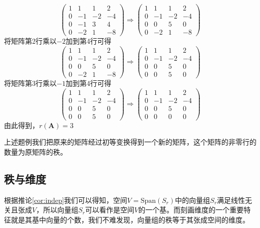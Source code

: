 \begin{example}
$$\begin{pmatrix}
		1 & 1 & 1 & 2\\
		0 & -1 & -2 & -4\\
		0 & -1 & 3 & 4\\
		0 & -2 & 1 & -8
	   \end{pmatrix}\Longrightarrow\begin{pmatrix}
		1 & 1 & 1 & 2\\
		0 & -1 & -2 & -4\\
		0 & 0 & 5 & 0\\
		0 & -2 & 1 & -8
	   \end{pmatrix}$$将矩阵第2行乘以$-2$加到第4行可得$$\begin{pmatrix}
		1 & 1 & 1 & 2\\
		0 & -1 & -2 & -4\\
		0 & 0 & 5 & 0\\
		0 & -2 & 1 & -8
	   \end{pmatrix}\Longrightarrow\begin{pmatrix}
		1 & 1 & 1 & 2\\
		0 & -1 & -2 & -4\\
		0 & 0 & 5 & 0\\
		0 & 0 & 5 & 0
	   \end{pmatrix}$$将矩阵第3行乘以$-1$加到第4行可得$$\begin{pmatrix}
		1 & 1 & 1 & 2\\
		0 & -1 & -2 & -4\\
		0 & 0 & 5 & 0\\
		0 & 0 & 5 & 0
	   \end{pmatrix}\Longrightarrow\begin{pmatrix}
		1 & 1 & 1 & 2\\
		0 & -1 & -2 & -4\\
		0 & 0 & 5 & 0\\
		0 & 0 & 0 & 0
	   \end{pmatrix}$$由此得到，$r(\mathbf{A})=3$
\end{example}

上述题例我们把原来的矩阵经过初等变换得到一个新的矩阵，这个矩阵的非零行的数量为原矩阵的秩。

\subsection{秩与维度}

根据推论\ref{cor:indep}我们可以得知，空间$V=\text{Span}(S_r)$中的向量组$S_r$满足线性无关且张成$V$，所以向量组$S_r$可以看作是空间$V$的一个基。而刻画维度的一个重要特征就是其基中向量的个数，我们不难发现，向量组的秩等于其张成空间的维度。


